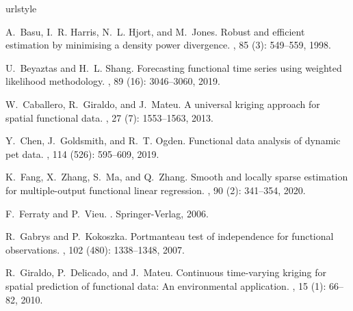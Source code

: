 \documentclass[12pt]{interact}
\theoremstyle{plain}%
\theoremstyle{definition}
\theoremstyle{remark}
\begin{document}
\begin{thebibliography}{25}
	\providecommand{\natexlab}[1]{#1}
	\providecommand{\url}[1]{\texttt{#1}}
	\expandafter\ifx\csname urlstyle\endcsname\relax
	\providecommand{\doi}[1]{doi: #1}\else
	\providecommand{\doi}{doi: \begingroup \urlstyle{rm}\Url}\fi
	
	A.~Basu, I.~R. Harris, N.~L. Hjort, and M.~Jones.
	\newblock Robust and efficient estimation by minimising a density power
	divergence.
	, 85 (3): 549--559, 1998.
	
	U.~Beyaztas and H.~L. Shang.
	\newblock Forecasting functional time series using weighted likelihood
	methodology.
	, 89
	(16): 3046--3060, 2019.
	
	W.~Caballero, R.~Giraldo, and J.~Mateu.
	\newblock A universal kriging approach for spatial functional data.
	, 27
	(7): 1553--1563, 2013.
	
	Y.~Chen, J.~Goldsmith, and R.~T. Ogden.
	\newblock Functional data analysis of dynamic pet data.
	, 114
	(526): 595--609, 2019.
	
	K.~Fang, X.~Zhang, S.~Ma, and Q.~Zhang.
	\newblock Smooth and locally sparse estimation for multiple-output functional
	linear regression.
	, 90
	(2): 341--354, 2020.
	
	F.~Ferraty and P.~Vieu.
	.
	\newblock Springer-Verlag, 2006.
	
	R.~Gabrys and P.~Kokoszka.
	\newblock Portmanteau test of independence for functional observations.
	, 102
	(480): 1338--1348, 2007.
	
	R.~Giraldo, P.~Delicado, and J.~Mateu.
	\newblock Continuous time-varying kriging for spatial prediction of functional
	data: An environmental application.
	,
	15 (1): 66--82, 2010.
	

\end{thebibliography}
\end{document}
